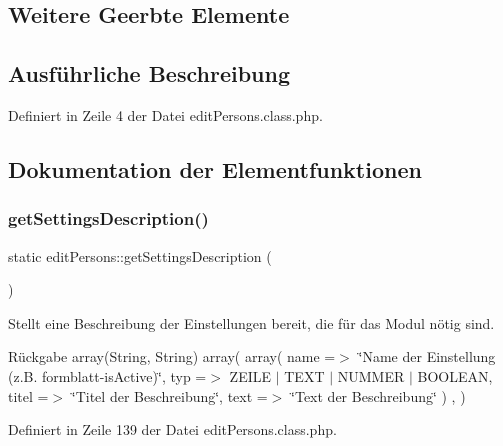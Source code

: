 \subsection*{Weitere Geerbte Elemente}


\subsection{Ausführliche Beschreibung}


Definiert in Zeile 4 der Datei edit\+Persons.\+class.\+php.



\subsection{Dokumentation der Elementfunktionen}
\mbox{\label{classedit_persons_a8d9fe31c22a69a365fb355255b3aa8ef}} 
\subsubsection{\texorpdfstring{get\+Settings\+Description()}{getSettingsDescription()}}
{\footnotesize\ttfamily static edit\+Persons\+::get\+Settings\+Description (\begin{DoxyParamCaption}{ }\end{DoxyParamCaption})\hspace{0.3cm}{\ttfamily [static]}}

Stellt eine Beschreibung der Einstellungen bereit, die für das Modul nötig sind. \begin{DoxyReturn}{Rückgabe}
array(\+String, String) array( array( \textquotesingle{}name\textquotesingle{} =$>$ \char`\"{}\+Name der Einstellung (z.\+B. formblatt-\/is\+Active)\char`\"{}, \textquotesingle{}typ\textquotesingle{} =$>$ Z\+E\+I\+LE $\vert$ T\+E\+XT $\vert$ N\+U\+M\+M\+ER $\vert$ B\+O\+O\+L\+E\+AN, \textquotesingle{}titel\textquotesingle{} =$>$ \char`\"{}\+Titel der Beschreibung\char`\"{}, \textquotesingle{}text\textquotesingle{} =$>$ \char`\"{}\+Text der Beschreibung\char`\"{} ) , ) 
\end{DoxyReturn}


Definiert in Zeile 139 der Datei edit\+Persons.\+class.\+php.

\mbox{\label{classedit_persons_a5a2d38aba62f94b134795b8fa31d038f}} 
